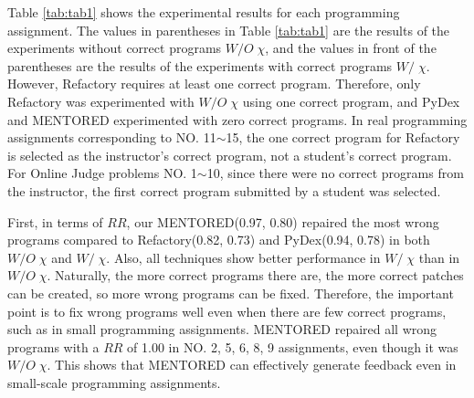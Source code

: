 \documentclass[10pt,conference]{IEEEtran}
\begin{document}
        Table \ref{tab:tab1} shows the experimental results for each programming assignment. The values in parentheses in Table \ref{tab:tab1} are the results of the experiments without correct programs $W/O\;\chi$, and the values in front of the parentheses are the results of the experiments with correct programs $W/\;\chi$. However, Refactory requires at least one correct program. Therefore, only Refactory was experimented with $W/O\;\chi$ using one correct program, and PyDex and MENTORED experimented with zero correct programs. In real programming assignments corresponding to NO. 11$\sim$15, the one correct program for Refactory is selected as the instructor's correct program, not a student's correct program. For Online Judge problems NO. 1$\sim$10, since there were no correct programs from the instructor, the first correct program submitted by a student was selected.

        First, in terms of $RR$, our MENTORED(0.97, 0.80) repaired the most wrong programs compared to Refactory(0.82, 0.73) and PyDex(0.94, 0.78) in both $W/O\;\chi$ and $W/\;\chi$. Also, all techniques show better performance in $W/\;\chi$ than in $W/O\;\chi$. Naturally, the more correct programs there are, the more correct patches can be created, so more wrong programs can be fixed. Therefore, the important point is to fix wrong programs well even when there are few correct programs, such as in small programming assignments. MENTORED repaired all wrong programs with a $RR$ of 1.00 in NO. 2, 5, 6, 8, 9 assignments, even though it was $W/O\;\chi$. This shows that MENTORED can effectively generate feedback even in small-scale programming assignments.
        
\end{document}
